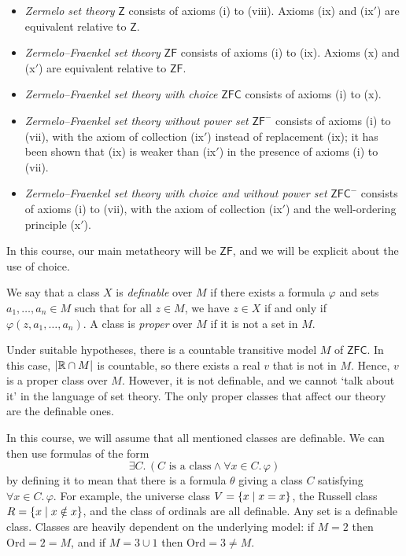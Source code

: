\begin{itemize}
    \item \emph{Zermelo set theory} \( \mathsf{Z} \) consists of axioms (i) to (viii).
    Axioms (ix) and (ix\('\)) are equivalent relative to \( \mathsf{Z} \).
    \item \emph{Zermelo--Fraenkel set theory} \( \mathsf{ZF} \) consists of axioms (i) to (ix).
    Axioms (x) and (x\('\)) are equivalent relative to \( \mathsf{ZF} \).
    \item \emph{Zermelo--Fraenkel set theory with choice} \( \mathsf{ZFC} \) consists of axioms (i) to (x).
    \item \emph{Zermelo--Fraenkel set theory without power set} \( \mathsf{ZF}^- \) consists of axioms (i) to (vii), with the axiom of collection (ix\('\)) instead of replacement (ix); it has been shown that (ix) is weaker than (ix\('\)) in the presence of axioms (i) to (vii).
    \item \emph{Zermelo--Fraenkel set theory with choice and without power set} \( \mathsf{ZFC}^- \) consists of axioms (i) to (vii), with the axiom of collection (ix\('\)) and the well-ordering principle (x\('\)).
\end{itemize}
In this course, our main metatheory will be \( \mathsf{ZF} \), and we will be explicit about the use of choice.

We say that a class \( X \) is \emph{definable} over \( M \) if there exists a formula \( \varphi \) and sets \( a_1, \dots, a_n \in M \) such that for all \( z \in M \), we have \( z \in X \) if and only if \( \varphi(z, a_1, \dots, a_n) \).
A class is \emph{proper} over \( M \) if it is not a set in \( M \).

Under suitable hypotheses, there is a countable transitive model \( M \) of \( \mathsf{ZFC} \).
In this case, \( \abs{\mathbb R \cap M} \) is countable, so there exists a real \( v \) that is not in \( M \).
Hence, \( v \) is a proper class over \( M \).
However, it is not definable, and we cannot `talk about it' in the language of set theory.
The only proper classes that affect our theory are the definable ones.

In this course, we will assume that all mentioned classes are definable.
We can then use formulas of the form
\[ \exists C.\, (C \text{ is a class} \wedge \forall x \in C.\, \varphi) \]
by defining it to mean that there is a formula \( \theta \) giving a class \( C \) satisfying \( \forall x \in C.\, \varphi \).
For example, the universe class \( V = \qty{x \mid x = x} \), the Russell class \( R = \qty{x \mid x \notin x} \), and the class of ordinals are all definable.
Any set is a definable class.
Classes are heavily dependent on the underlying model: if \( M = 2 \) then \( \mathrm{Ord} = 2 = M \), and if \( M = 3 \cup \qty{1} \) then \( \mathrm{Ord} = 3 \neq M \).

